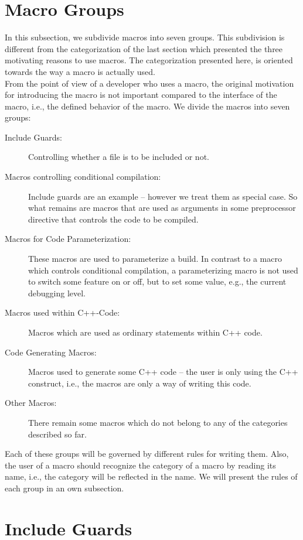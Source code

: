 \section{Macro Groups}
\label{sec:macro-groups}

In this subsection, we subdivide macros into seven groups. This
subdivision is different from the categorization of the last section
which presented the three motivating reasons to use macros.  The
categorization presented here, is oriented towards the way a macro is
actually used.\\
%
From the point of view of a developer who uses a macro, the original
motivation for introducing the macro is not important compared to the
interface of the macro, i.e., the defined behavior of the macro. 
%
We divide the macros into seven groups:
%
\begin{description}
\item[Include Guards:] Controlling whether a file is to be included or
  not.
\item[Macros controlling conditional compilation:] Include guards are
  an example -- however we treat them as special case. So what remains
  are macros that are used as arguments in some preprocessor directive
  that controls the code to be compiled. 
\item[Macros for Code Parameterization:] These macros are used to
  parameterize a build. In contrast to a macro which controls
  conditional compilation, a parameterizing macro is not used to
  switch some feature on or off, but to set some value, e.g., the
  current debugging level.
\item[Macros used within C++-Code:] Macros which are used as ordinary
  statements within C++ code.
\item[Code Generating Macros:] Macros used to generate some C++ code
  -- the user is only using the C++ construct, i.e., the macros are
  only a way of writing this code. 
\item[Other Macros:] There remain some macros which do not belong to
  any of the categories described so far. 
\end{description}
%
Each of these groups will be governed by different rules for writing
them. Also, the user of a macro should recognize the category of a
macro by reading its name, i.e., the category will be reflected in the
name. We will present the rules of each group in an own subsection.
%


\section{Include Guards}
\label{sec:include-guards}

